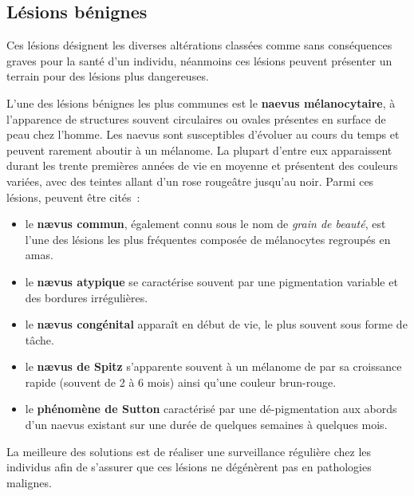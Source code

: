 \subsection{Lésions bénignes}
Ces lésions désignent les diverses altérations classées comme sans conséquences graves pour la santé d'un individu, néanmoins ces lésions peuvent présenter un terrain pour des lésions plus dangereuses.\par

L'une des lésions bénignes les plus communes est le \textbf{naevus mélanocytaire}, à l’apparence de structures souvent circulaires ou ovales présentes en surface de peau chez l’homme. Les naevus sont susceptibles d’évoluer au cours du temps et peuvent rarement aboutir à un mélanome. La plupart d'entre eux apparaissent durant les trente premières années de vie en moyenne et présentent des couleurs variées, avec des teintes allant d'un rose rougeâtre jusqu'au noir. Parmi ces lésions, peuvent être cités~:
\begin{itemize}
    \item le \textbf{nævus commun}, également connu sous le nom de \textit{grain de beauté}, est l'une des lésions les plus fréquentes composée de mélanocytes regroupés en amas.
    \item le \textbf{nævus atypique} se caractérise souvent par une pigmentation variable et des bordures irrégulières.
    \item le \textbf{nævus congénital} apparaît en début de vie, le plus souvent sous forme de tâche.
    \item le \textbf{nævus de Spitz} s’apparente souvent à un mélanome de par sa croissance rapide (souvent de 2 à 6 mois) ainsi qu’une couleur brun-rouge.
    \item le \textbf{phénomène de Sutton} caractérisé par une dé-pigmentation aux abords d’un naevus existant sur une durée de quelques semaines à quelques mois.
\end{itemize}\par

La meilleure des solutions est de réaliser une surveillance régulière chez les individus afin de s'assurer que ces lésions ne dégénèrent pas en pathologies malignes.\par

